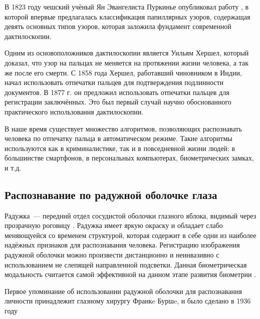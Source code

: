 \documentclass[14pt, a4paper]{extarticle}
\begin{document}
В 1823 году чешский учёный Ян Эвангелиста Пуркинье опубликовал работу \cite{purkynve2013dissertation}, в которой впервые предлагалась классификация папиллярных узоров, содержащая девять основных типов узоров, которая заложила фундамент современной дактилоскопии. 

Одним из основоположников дактилоскопии является Уильям Хершел, который доказал, что узор на пальцах не меняется на протяжении жизни человека, а так же после его смерти. С 1858 года Хершел, работавший чиновником в Индии, начал использовать отпечатки пальцев для подтверждения подлинности документов. В 1877 г. он предложил использовать отпечатки пальцев для регистрации заключённых. Это был первый случай научно обоснованного практического использования дактилоскопии.

В наше время существует множество алгоритмов, позволяющих распознавать человека по отпечатку пальца в автоматическом режиме. Такие алгоритмы используются как в криминалистике, так и в повседневной жизни людей: в большинстве смартфонов, в персональных компьютерах, биометрических замках, и т.д.

\subsection{Распознавание по радужной оболочке глаза}
Радужка~--- передний отдел сосудистой оболочки глазного яблока, видимый через прозрачную роговицу \cite{petrovskiy1974bme}. Радужка имеет яркую окраску и обладает слабо меняющуейся со временем структурой, которая содержит в себе одни из наиболее надёжных признаков для распознавания человека. Регистрацию изображения радужной оболочки можно произвести дистанционно и неинвазивно с использованием не слепящей направленной подсветки. Данная биометрическая модальность считается самой эффективной на данном этапе развития биометрии \cite{gupta2011iris}.

Первое упоминание об использовании радужной оболочки для распознавания личности принадлежит глазному хирургу Франкe Буршe, и было сделано в 1936 году \cite{misztal2012iris}
\end{document}
